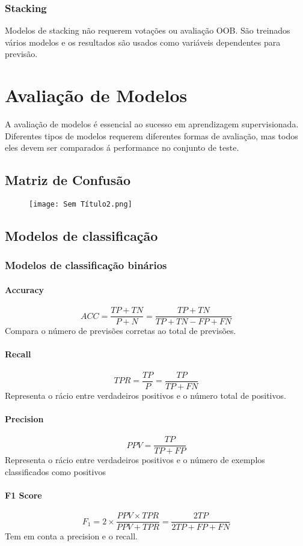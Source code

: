 \documentclass[10pt,a4paper]{report}
\begin{document}
\subsection{Stacking}
Modelos de stacking não requerem votações ou avaliação OOB. São treinados vários modelos e os resultados são usados como variáveis dependentes para previsão.

\chapter{Avaliação de Modelos}
A avaliação de modelos é essencial ao sucesso em aprendizagem supervisionada. Diferentes tipos de modelos requerem diferentes formas de avaliação, mas todos eles devem ser comparados á performance no conjunto de teste.
\section{Matriz de Confusão}
\begin{figure}[H]
\centering
\texttt{[image: Sem Título2.png]}
\end{figure}
\section{Modelos de classificação}
\subsection{Modelos de classificação binários}
\subsubsection{Accuracy}
$$
ACC = \frac{TP + TN}{P + N} = \frac{TP + TN}{TP + TN - FP + FN}
$$
Compara o número de previsões corretas ao total de previsões.
\subsubsection{Recall}
$$
TPR = \frac{TP}{P} = \frac{TP}{TP + FN}
$$
Representa o rácio entre verdadeiros positivos e o número total de positivos.
\subsubsection{Precision}
$$
PPV = \frac{TP}{TP + FP}
$$
Representa o rácio entre verdadeiros positivos e o número de exemplos classificados como positivos
\subsubsection{F1 Score}
$$
F_1 = 2 \times \frac{PPV \times TPR}{PPV + TPR} = \frac{2TP}{2TP + FP + FN}
$$
Tem em conta a precision e o recall.
\end{document}
